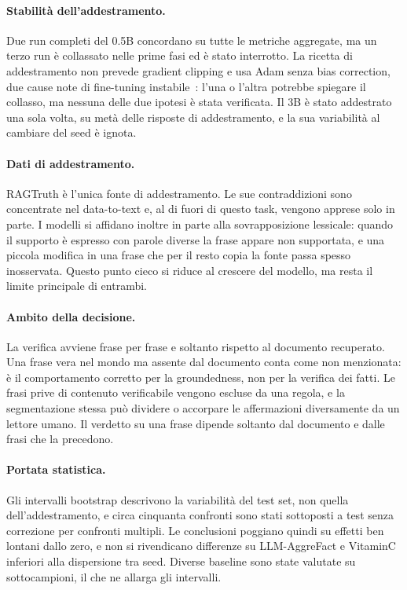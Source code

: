 \paragraph{Stabilità dell'addestramento.} Due run completi del 0.5B concordano su tutte le metriche aggregate, ma un
terzo run è collassato nelle prime fasi ed è stato interrotto. La ricetta di addestramento non prevede gradient clipping
e usa Adam senza bias correction, due cause note di fine-tuning
instabile~\cite{pascanu2013difficulty,mosbach2021stability}: l'una o l'altra potrebbe spiegare il collasso, ma nessuna
delle due ipotesi è stata verificata. Il 3B è stato addestrato una sola volta, su metà delle risposte di addestramento, e
la sua variabilità al cambiare del seed è ignota.

\paragraph{Dati di addestramento.} RAGTruth è l'unica fonte di addestramento. Le sue contraddizioni sono concentrate nel
data-to-text e, al di fuori di questo task, vengono apprese solo in parte. I modelli si affidano inoltre in parte alla
sovrapposizione lessicale: quando il supporto è espresso con parole diverse la frase appare non supportata, e una piccola
modifica in una frase che per il resto copia la fonte passa spesso inosservata. Questo punto cieco si riduce al crescere
del modello, ma resta il limite principale di entrambi.

\paragraph{Ambito della decisione.} La verifica avviene frase per frase e soltanto rispetto al documento recuperato. Una
frase vera nel mondo ma assente dal documento conta come non menzionata: è il comportamento corretto per la groundedness,
non per la verifica dei fatti. Le frasi prive di contenuto verificabile vengono escluse da una regola, e la segmentazione
stessa può dividere o accorpare le affermazioni diversamente da un lettore umano. Il verdetto su una frase dipende
soltanto dal documento e dalle frasi che la precedono.

\paragraph{Portata statistica.} Gli intervalli bootstrap descrivono la variabilità del test set, non quella
dell'addestramento, e circa cinquanta confronti sono stati sottoposti a test senza correzione per confronti multipli. Le
conclusioni poggiano quindi su effetti ben lontani dallo zero, e non si rivendicano differenze su LLM-AggreFact e VitaminC
inferiori alla dispersione tra seed. Diverse baseline sono state valutate su sottocampioni, il che ne allarga gli
intervalli.


